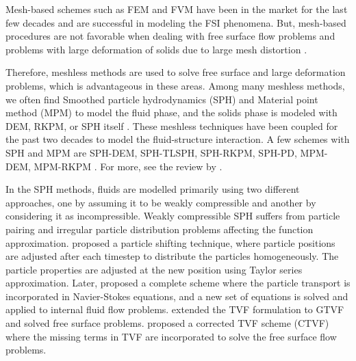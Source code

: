 \documentclass[preprint,12pt]{elsarticle}
\begin{document}
Mesh-based schemes such as FEM \cite{lozovskiy2015unconditionally} and FVM
\cite{jasak2007updated} have been in the market for the last few decades
and are successful in modeling the FSI phenomena. But, mesh-based procedures are
not favorable when dealing with free surface flow problems and problems with
large deformation of solids due to large mesh distortion
\cite{moresi2003lagrangian}.



Therefore, meshless methods are used to solve free surface and large deformation
problems, which is advantageous in these areas. Among many meshless methods, we
often find Smoothed particle hydrodynamics (SPH) and Material point method (MPM)
to model the fluid phase, and the solids phase is modeled with DEM, RKPM, or SPH
itself \cite{hu2010material,li2022material}. These meshless techniques have
been coupled for the past two decades to model the fluid-structure interaction.
A few schemes with SPH and MPM are SPH-DEM, SPH-TLSPH, SPH-RKPM, SPH-PD,
MPM-DEM, MPM-RKPM \cite{khayyer2022systematic}. For more, see the review by
\cite{khayyer2022systematic}.%

In the SPH methods, fluids are modelled primarily using two different
approaches, one by assuming it to be weakly compressible and another by
considering it as incompressible.
Weakly compressible SPH suffers from particle pairing and irregular particle
distribution problems affecting the function approximation.
\cite{xu2009accuracy} proposed a particle shifting technique, where particle
positions are adjusted after each timestep to distribute the particles
homogeneously. The particle properties are adjusted at the new position using
Taylor series approximation. Later, \cite{adami2013transport} proposed a
complete scheme where the particle transport is incorporated in Navier-Stokes
equations, and a new set of equations is solved and applied to internal fluid
flow problems. \cite{zhang_hu_adams17} extended the TVF formulation to GTVF
and solved free surface problems. \cite{adepu2021corrected}proposed a
corrected TVF scheme (CTVF) where the missing terms in TVF are incorporated to
solve the free surface flow problems.
\end{document}
